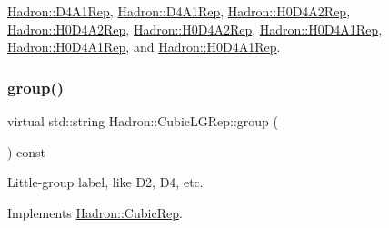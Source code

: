 \mbox{\hyperlink{structHadron_1_1D4A1Rep_a4224f0d47cc0a894a9da4c8505d51c29}{Hadron\+::\+D4\+A1\+Rep}}, \mbox{\hyperlink{structHadron_1_1D4A1Rep_a4224f0d47cc0a894a9da4c8505d51c29}{Hadron\+::\+D4\+A1\+Rep}}, \mbox{\hyperlink{structHadron_1_1H0D4A2Rep_a637522dc6caee2869b2bb632a4c5a5b5}{Hadron\+::\+H0\+D4\+A2\+Rep}}, \mbox{\hyperlink{structHadron_1_1H0D4A2Rep_a637522dc6caee2869b2bb632a4c5a5b5}{Hadron\+::\+H0\+D4\+A2\+Rep}}, \mbox{\hyperlink{structHadron_1_1H0D4A2Rep_a637522dc6caee2869b2bb632a4c5a5b5}{Hadron\+::\+H0\+D4\+A2\+Rep}}, \mbox{\hyperlink{structHadron_1_1H0D4A1Rep_ab13ff026da1bc59df4b52835038296d5}{Hadron\+::\+H0\+D4\+A1\+Rep}}, \mbox{\hyperlink{structHadron_1_1H0D4A1Rep_ab13ff026da1bc59df4b52835038296d5}{Hadron\+::\+H0\+D4\+A1\+Rep}}, and \mbox{\hyperlink{structHadron_1_1H0D4A1Rep_ab13ff026da1bc59df4b52835038296d5}{Hadron\+::\+H0\+D4\+A1\+Rep}}.

\mbox{\label{structHadron_1_1CubicLGRep_a9bdb14b519a611d21379ed96a3a9eb41}} 
\subsubsection{\texorpdfstring{group()}{group()}\hspace{0.1cm}{\footnotesize\ttfamily [1/3]}}
{\footnotesize\ttfamily virtual std\+::string Hadron\+::\+Cubic\+L\+G\+Rep\+::group (\begin{DoxyParamCaption}{ }\end{DoxyParamCaption}) const\hspace{0.3cm}{\ttfamily [pure virtual]}}

Little-\/group label, like D2, D4, etc. 

Implements \mbox{\hyperlink{structHadron_1_1CubicRep_a0748f11ec87f387062c8e8981339a29c}{Hadron\+::\+Cubic\+Rep}}.




